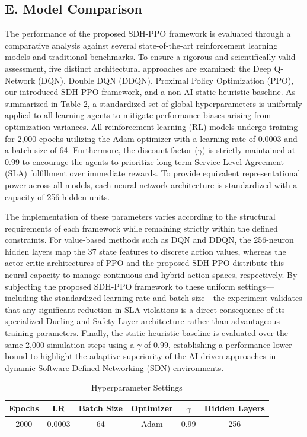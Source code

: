 \subsection{E. Model Comparison}\label{e.-model-comparison}

The performance of the proposed SDH-PPO framework is evaluated through a comparative analysis against several state-of-the-art reinforcement learning models and traditional benchmarks. To ensure a rigorous and scientifically valid assessment, five distinct architectural approaches are examined: the Deep Q-Network (DQN), Double DQN (DDQN), Proximal Policy Optimization (PPO), our introduced SDH-PPO framework, and a non-AI static heuristic baseline. As summarized in Table 2, a standardized set of global hyperparameters is uniformly applied to all learning agents to mitigate performance biases arising from optimization variances. All reinforcement learning (RL) models undergo training for 2,000 epochs utilizing the Adam optimizer with a learning rate of 0.0003 and a batch size of 64. Furthermore, the discount factor (\(\gamma\)) is strictly maintained at 0.99 to encourage the agents to prioritize long-term Service Level Agreement (SLA) fulfillment over immediate rewards. To provide equivalent representational power across all models, each neural network architecture is standardized with a capacity of 256 hidden units.

The implementation of these parameters varies according to the structural requirements of each framework while remaining strictly within the defined constraints. For value-based methods such as DQN and DDQN, the 256-neuron hidden layers map the 37 state features to discrete action values, whereas the actor-critic architectures of PPO and the proposed SDH-PPO distribute this neural capacity to manage continuous and hybrid action spaces, respectively. By subjecting the proposed SDH-PPO framework to these uniform settings---including the standardized learning rate and batch size---the experiment validates that any significant reduction in SLA violations is a direct consequence of its specialized Dueling and Safety Layer architecture rather than advantageous training parameters. Finally, the static heuristic baseline is evaluated over the same 2,000 simulation steps using a \(\gamma\) of 0.99, establishing a performance lower bound to highlight the adaptive superiority of the AI-driven approaches in dynamic Software-Defined Networking (SDN) environments.

\begin{table}[htbp]
\centering
\caption{Hyperparameter Settings}
\label{tab:2}
\begin{tabular}{cccccc}
\toprule
Epochs & LR & Batch Size & Optimizer & $\gamma$ & Hidden Layers \\
\midrule
2000 & 0.0003 & 64 & Adam & 0.99 & 256 \\
\bottomrule
\end{tabular}
\end{table}

